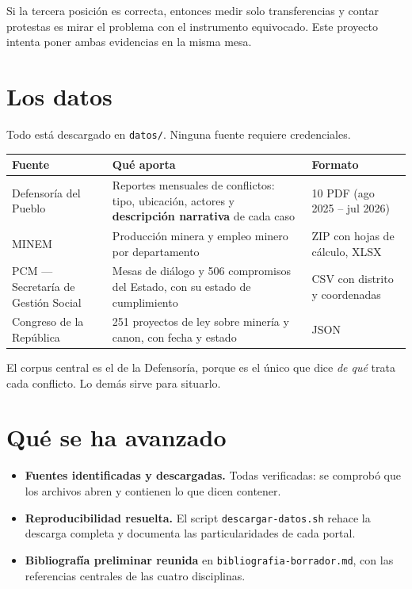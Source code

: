 \documentclass[11pt,a4paper]{article}
\newcommand{\hecho}{\textcolor{azul}{$\blacksquare$}}
\begin{document}
Si la tercera posición es correcta, entonces medir solo transferencias y contar
protestas es mirar el problema con el instrumento equivocado. Este proyecto
intenta poner ambas evidencias en la misma mesa.

\section{Los datos}

Todo está descargado en \texttt{datos/}. Ninguna fuente requiere credenciales.

\begin{longtable}{@{}p{5.1cm}p{6.4cm}p{3.3cm}@{}}
\toprule
\textbf{Fuente} & \textbf{Qué aporta} & \textbf{Formato} \\
\midrule
\endhead
Defensoría del Pueblo &
Reportes mensuales de conflictos: tipo, ubicación, actores y \textbf{descripción
narrativa} de cada caso &
10 PDF (ago 2025 -- jul 2026) \\
\addlinespace
MINEM &
Producción minera y empleo minero por departamento &
ZIP con hojas de cálculo, XLSX \\
\addlinespace
PCM --- Secretaría de Gestión Social &
Mesas de diálogo y 506 compromisos del Estado, con su estado de cumplimiento &
CSV con distrito y coordenadas \\
\addlinespace
Congreso de la República &
251 proyectos de ley sobre minería y canon, con fecha y estado &
JSON \\
\bottomrule
\end{longtable}

El corpus central es el de la Defensoría, porque es el único que dice
\emph{de qué} trata cada conflicto. Lo demás sirve para situarlo.

\section{Qué se ha avanzado}

\begin{itemize}[label=\hecho]
  \item \textbf{Fuentes identificadas y descargadas.} Todas verificadas: se
  comprobó que los archivos abren y contienen lo que dicen contener.
  \item \textbf{Reproducibilidad resuelta.} El script
  \texttt{descargar-datos.sh} rehace la descarga completa y documenta las
  particularidades de cada portal.
  \item \textbf{Bibliografía preliminar reunida} en
  \texttt{bibliografia-borrador.md}, con las referencias centrales de las cuatro
  disciplinas.
\end{itemize}
\end{document}
